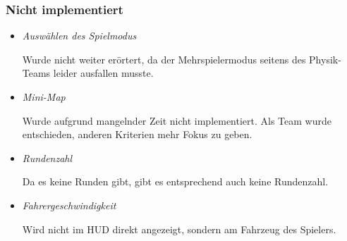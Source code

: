 \subsubsection{Nicht implementiert}
\begin{itemize}
    \item \textit{Auswählen des Spielmodus}
        \begin{leftbar}[0.9\linewidth]
            Wurde nicht weiter erörtert, da der Mehrspielermodus 
            seitens des Physik-Teams leider ausfallen musste.
        \end{leftbar}
    \item \textit{Mini-Map}
        \begin{leftbar}[0.9\linewidth]
            Wurde aufgrund mangelnder Zeit nicht implementiert.
            Als Team wurde entschieden, anderen Kriterien mehr 
            Fokus zu geben.
        \end{leftbar}
    \item \textit{Rundenzahl}
        \begin{leftbar}[0.9\linewidth]
            Da es keine Runden gibt, gibt es entsprechend auch keine 
            Rundenzahl.
        \end{leftbar}
    \item \textit{Fahrergeschwindigkeit}
        \begin{leftbar}[0.9\linewidth]
            Wird nicht im HUD direkt angezeigt, sondern am 
            Fahrzeug des Spielers.
        \end{leftbar}
\end{itemize}
